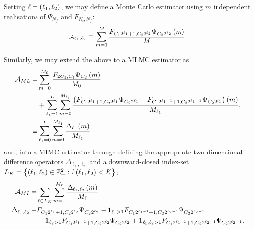 \documentclass[11pt]{amsart}
\begin{document}
Setting $\ell = \left( {\ell_1 , \ell_2} \right)$, we may define a Monte
Carlo estimator using $m$ independent realisations of $\Psi_{N_f}$ and $F_{N_t,N_f}$:
\begin{align}
\mathcal A_{\ell_1, \ell_2} 
\equiv
\displaystyle\sum\limits_{m=1}^{M}
\frac{F_{C_1 2^{\ell_1}+1,C_2 2^{\ell_2}} \Psi_{C_2 2^{\ell_2} }\left( {m} \right)}{M}.
\end{align}

Similarly, we may extend the above to a MLMC estimator as
\begin{align*}
\mathcal{A}_{ML} =& \displaystyle\sum\limits_{m=0}^{M_0} \frac{F_{2 C_1 ,C_2 } \Psi_{C_2 }\left( {m} \right)}{M_0}
\\
&+
\displaystyle\sum\limits_{\ell_1=1}^{L}
\displaystyle\sum\limits_{m=0}^{M_{\ell_1}} \frac{\left( { F_{C_1 2^{\ell_1}+1,C_2 2^{\ell_1}} \Psi_{C_2 2^{\ell_1} } - F_{C_1 2^{\ell_1-1}+1,C_2 2^{\ell_1-1}} \Psi_{C_2 2^{\ell_1} }} \right) \left( {m} \right) }{M_{\ell_1}},
\\
\equiv& \displaystyle\sum\limits_{\ell_1=0}^{L} \displaystyle\sum\limits_{m=0}^{M_{\ell_1}} \frac{\Delta_{\ell_1} \left( {m} \right)}{M_{\ell_1}}
\end{align*}
and, into a MIMC estimator through defining the appropriate two-dimensional difference operators $\Delta_{\ell_1,\ell_2}$ and a downward-closed index-set $L_K=\left\lbrace {\left( {\ell_1,\ell_2} \right)\in \mathbb Z_+^2: I \left( {\ell_1,\ell_2} \right)<K} \right\rbrace$:
\begin{align*}
\mathcal A_{MI} =& \displaystyle\sum\limits_{\ell \in L_K}^{} \displaystyle\sum\limits_{m=1}^{M_{\ell}} \frac{\Delta_{\ell_1,\ell_2} \left( {m} \right)}{M_\ell}
\\
\Delta_{\ell_1,\ell_2}
\equiv&
F_{C_1 2^{\ell_1}+1,C_2 2^{\ell_2}} \Psi_{C_2 2^{\ell_2} } - \mathbf{1}_{\ell_1>1} F_{C_1 2^{\ell_1-1}+1,C_2 2^{\ell_2-1}} \Psi_{C_2 2^{\ell_2-1} }
\\
& -\mathbf{1}_{\ell_2>1} F_{C_1 2^{\ell_1-1}+1,C_2 2^{\ell_2}} \Psi_{C_2 2^{\ell_2} }
+ \mathbf{1}_{\ell_1,\ell_2>1} F_{C_1 2^{\ell_1-1}+1,C_2 2^{\ell_2-1}} \Psi_{C_2 2^{\ell_2-1} }.
\end{align*}
\end{document}
